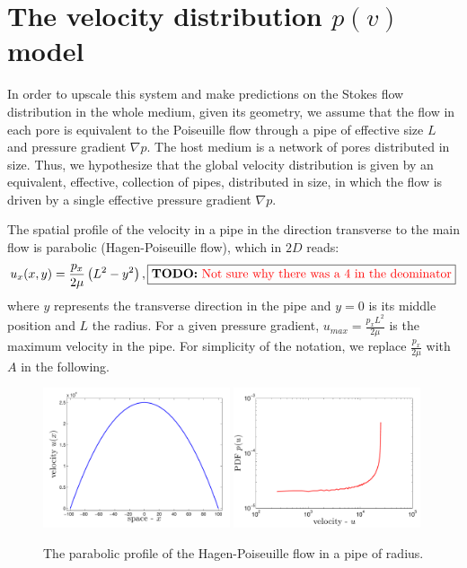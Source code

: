\documentclass[onecolumn,showpacs,pre,preprintnumbers,floatfix]{revtex4-1}
\newcommand{\todo}[1]{ \fbox{{\bf TODO:} \color{red} #1}}
\begin{document}
\section{The velocity distribution $p(v)$ model}
In order to upscale this system and make predictions on the Stokes flow
distribution in the whole medium, given its geometry, we assume that the
flow in each pore is equivalent to the Poiseuille flow through a pipe of
effective size $L$ and pressure gradient $\nabla p$. The host medium is
a network of pores distributed in size. Thus, we hypothesize that the
global velocity distribution is given by an equivalent, effective,
collection of pipes, distributed in size, in which the flow is driven by
a single effective pressure gradient $\nabla p$.

The spatial profile of the velocity in a pipe in the direction
transverse to the main flow is parabolic (Hagen-Poiseuille flow), which
in $2D$ reads:
%
\begin{align}
  u_{x}(x,y) = \frac{p_{x}}{2\mu} \left(L^2 - y^2 \right),
  \label{e:poiseuille}
  \todo{Not sure why there was a 4 in the deominator}
\end{align}
%
where $y$ represents the transverse direction in the pipe and $y = 0$ is
its middle position and $L$ the radius. For a given pressure gradient,
$u_{max} = \frac{p_{x}L^{2}}{2\mu}$ is the maximum velocity in the pipe.
For simplicity of the notation, we replace $\frac{p_{x}}{2\mu}$ with $A$
in the following.
%
\begin{figure}[h!]
  \begin{center}
  \includegraphics[width=0.49\textwidth]{./images/u.pdf} 
  \includegraphics[width=0.49\textwidth]{./images/pdf_u2.pdf}
  \caption{The parabolic profile of the Hagen-Poiseuille flow in a pipe
  of radius.}\label{f:HPflow}
  \end{center}
\end{figure}
\end{document}

